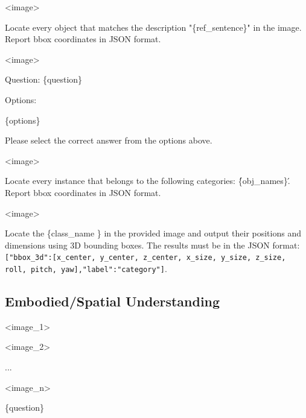 \begin{tcolorbox}[
  title=RefCOCO,
  fonttitle=\bfseries,
  colframe=black,
  colback=white,
  toptitle=1mm,
  bottomtitle=1mm,
  top=2mm,
  verbatim,
]
<image>

Locate every object that matches the description "\{ref\_sentence\}" in the image. Report bbox coordinates in JSON format.
\end{tcolorbox}

\begin{tcolorbox}[
  title=CountBench,
  fonttitle=\bfseries,
  colframe=black,
  colback=white,
  toptitle=1mm,
  bottomtitle=1mm,
  top=2mm,
  verbatim,
]
<image>

Question: \{question\}

Options:

\{options\}

Please select the correct answer from the options above.
\end{tcolorbox}

\begin{tcolorbox}[
  title=ODinW-13,
  fonttitle=\bfseries,
  colframe=black,
  colback=white,
  toptitle=1mm,
  bottomtitle=1mm,
  top=2mm,
  verbatim,
]
<image>

Locate every instance that belongs to the following categories: \'\{obj\_names\}\'. Report bbox coordinates in JSON format.
\end{tcolorbox}

\begin{tcolorbox}[
  title={ARKitScenes | Hypersim  | SUNRGBD},
  fonttitle=\bfseries,
  colframe=black,
  colback=white,
  toptitle=1mm,
  bottomtitle=1mm,
  top=2mm,
  verbatim,
]
<image>

Locate the \{class\_name \} in the provided image and output their positions and dimensions using 3D bounding boxes. The results must be in the JSON format: \texttt{[{"bbox\_3d":[x\_center, y\_center, z\_center, x\_size, y\_size, z\_size, roll, pitch, yaw],"label":"category"}]}. 
\end{tcolorbox}

\subsection{Embodied/Spatial
Understanding}
\label{sec:embodied}

\begin{tcolorbox}[
  title=ERQA,
  fonttitle=\bfseries,
  colframe=black,
  colback=white,
  toptitle=1mm,
  bottomtitle=1mm,
  top=2mm,
  verbatim,
]
<image\_1>

<image\_2>

...

<image\_n>

\{question\}
\end{tcolorbox}


